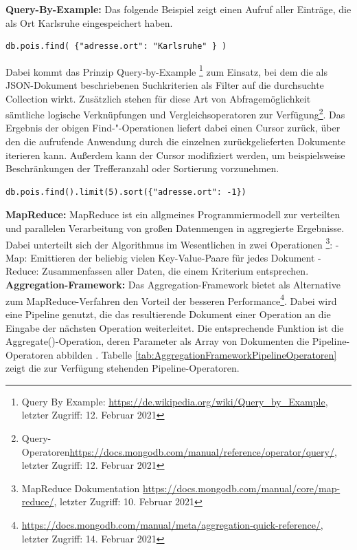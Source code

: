 \noindent
\textbf{Query-By-Example:}
Das folgende Beispiel zeigt einen Aufruf aller Einträge, die als Ort Karlsruhe eingespeichert haben. 
\newline
\begin{lstlisting}[caption=MongoDB Read, label=lst:MongoDBRead]
db.pois.find( {"adresse.ort": "Karlsruhe" } )
\end{lstlisting}

\noindent
Dabei kommt das Prinzip Query-by-Example \footnote{Query By Example: \url{https://de.wikipedia.org/wiki/Query_by_Example}, letzter Zugriff: 12. Februar 2021} zum Einsatz, bei dem die als JSON-Dokument beschriebenen Suchkriterien als Filter auf die durchsuchte Collection wirkt. Zusätzlich stehen für diese Art von Abfragemöglichkeit sämtliche logische Verknüpfungen und Vergleichsoperatoren zur Verfügung\footnote{Query-Operatoren\url{https://docs.mongodb.com/manual/reference/operator/query/}, letzter Zugriff: 12. Februar 2021}.
Das Ergebnis der obigen Find-"-Operationen liefert dabei einen Cursor zurück, über den die aufrufende Anwendung durch die einzelnen zurückgelieferten Dokumente iterieren kann. Außerdem kann der Cursor modifiziert werden, um beispielsweise Beschränkungen der Trefferanzahl oder Sortierung vorzunehmen. \\

\begin{lstlisting}[caption=MongoDB Read Modifikation, label=lst:MongoDBReadModifikation]
db.pois.find().limit(5).sort({"adresse.ort": -1})
\end{lstlisting}

\noindent
\textbf{MapReduce:}
MapReduce ist ein allgmeines Programmiermodell zur verteilten und parallelen Verarbeitung von großen Datenmengen in aggregierte Ergebnisse. Dabei unterteilt sich der Algorithmus im Wesentlichen in zwei Operationen \footnote{MapReduce Dokumentation \url{https://docs.mongodb.com/manual/core/map-reduce/}, letzter Zugriff: 10. Februar 2021}:
\newline
-	Map: Emittieren der beliebig vielen Key-Value-Paare für jedes Dokument
\newline
-	Reduce: Zusammenfassen aller Daten, die einem Kriterium entsprechen.\\

\noindent
\textbf{Aggregation-Framework:}
Das Aggregation-Framework bietet als Alternative zum MapReduce-Verfahren den Vorteil der besseren Performance\footnote{\url{https://docs.mongodb.com/manual/meta/aggregation-quick-reference/}, letzter Zugriff: 14. Februar 2021}. Dabei wird eine Pipeline genutzt, die das resultierende Dokument einer Operation an die Eingabe der nächsten Operation weiterleitet. Die entsprechende Funktion ist die Aggregate()-Operation, deren Parameter als Array von Dokumenten die Pipeline-Operatoren abbilden . Tabelle \ref{tab:AggregationFrameworkPipelineOperatoren} zeigt die zur Verfügung stehenden Pipeline-Operatoren.\\

